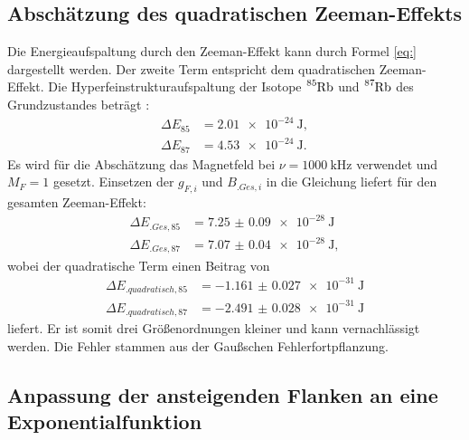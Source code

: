 \subsection{Abschätzung des quadratischen Zeeman-Effekts}

Die Energieaufspaltung durch den Zeeman-Effekt kann durch Formel \eqref{eq:} dargestellt werden. 
Der zweite Term entspricht dem quadratischen Zeeman-Effekt. Die Hyperfeinstrukturaufspaltung der Isotope $\ce{^{85}Rb}$ und $\ce{^{87}Rb}$ des Grundzustandes beträgt \cite{V21}:
\begin{align*}
\Delta E_{85} &= \SI{2.01e-24}{\joule},\\
\Delta E_{87} &= \SI{4.53e-24}{\joule}\text{.}
\end{align*}
Es wird für die Abschätzung das Magnetfeld bei $\nu=\SI{1000}{\kilo\hertz}$ verwendet und $M_F=1$ gesetzt. Einsetzen der $g_{F,i}$ und $B_{.{Ges},i}$ in die Gleichung liefert für den gesamten Zeeman-Effekt:
\begin{align*}
\Delta E_{.{Ges},85} &= \SI{7.25(9)e-28}{\joule}\\
\Delta E_{.{Ges},87} &= \SI{7.07(4)e-28}{\joule},
\end{align*}
wobei der quadratische Term einen Beitrag von
\begin{align*}
\Delta E_{.{quadratisch},85} &= \SI{-1.161(27)e-31}{\joule}\\
\Delta E_{.{quadratisch},87} &= \SI{-2.491(28)e-31}{\joule}
\end{align*}
liefert. Er ist somit drei Größenordnungen kleiner und kann vernachlässigt werden.
Die Fehler stammen aus der Gaußschen Fehlerfortpflanzung.

\subsection{Anpassung der ansteigenden Flanken an eine Exponentialfunktion}

